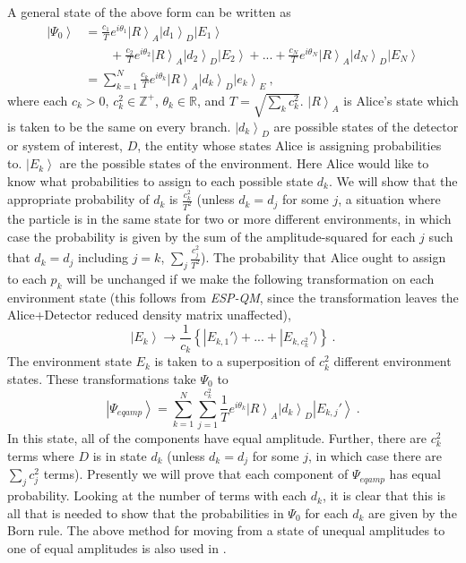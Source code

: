 \documentclass[12pt,onecolumn,secnumarabic,amsmath,amssymb,balancelastpage,nofootinbib]{article}
\newcommand{\ket}[1]{\ensuremath{\left|#1\right\rangle}}
\begin{document}
A general state of the above form can be written as
\begin{align}
\ket{\Psi_0}&= \frac{c_1}{T}e^{i\theta_1}\ket{R}_A\ket{d_1}_D\ket{E_1}\nonumber\\
&\qquad+\frac{c_2}{T}e^{i\theta_2}\ket{R}_A\ket{d_2}_D\ket{E_2}+...+\frac{c_N}{T}e^{i\theta_N}\ket{R}_A\ket{d_N}_D\ket{E_N}
\nonumber
\\
&= \sum_{k=1}^N{\frac{c_k}{T}e^{i\theta_k}\ket{R}_A\ket{d_k}_D\ket{e_k}_E}\ ,
\label{}
\end{align}
where each $c_k>0$, $c_k^2\in\mathbb{Z}^+$, $\theta_k\in\mathbb{R}$, and $T=\sqrt{\sum_k{c_k^2}}$.  $\ket{R}_A$ is Alice's state which is taken to be the same on every branch.  $\ket{d_k}_D$ are possible states of the detector or system of interest, $D$, the entity whose states Alice is assigning probabilities to.  $\ket{E_k}$ are the possible states of the environment.  Here Alice would like to know what probabilities to assign to each possible state $d_k$.  We will show that the appropriate probability of $d_k$ is $\frac{c_k^2}{T^2}$ (unless $d_k=d_j$ for some $j$, a situation where the particle is in the same state for two or more different environments, in which case the probability is given by the sum of the amplitude-squared for each $j$ such that $d_k=d_j$ including $j=k$, $\sum_j\frac{c_j^2}{T^2}$).  The probability that Alice ought to assign to each $p_k$ will be unchanged if we make the following transformation on each environment state (this follows from \emph{ESP-QM}, since the transformation leaves the Alice+Detector reduced density matrix unaffected),
\begin{equation}
\ket{E_k}\longrightarrow\frac{1}{c_k}\left\{|E_{k,1}'\rangle+...+|E_{k,c_k^2}'\rangle\right\}\ .
\label{}
\end{equation}
The environment state $E_k$ is taken to a superposition of $c_k^2$ different environment states.
These transformations take $\Psi_0$ to
\begin{equation}
\ket{\Psi_{eqamp}}=\sum_{k=1}^N{\sum_{j=1}^{c_k^2}\frac{1}{T}e^{i\theta_k}\ket{R}_A\ket{d_k}_D\ket{E_{k,j}'}}\ .
\label{eqamp}
\end{equation}
In this state, all of the components have equal amplitude.  Further, there are $c_k^2$ terms where $D$ is in state $d_k$ (unless $d_k=d_j$ for some $j$, in which case there are $\sum_j c_j^2$ terms).  Presently we will prove that each component of $\Psi_{eqamp}$ has equal probability.  Looking at the number of terms with each $d_k$, it is clear that this is all that is needed to show that the probabilities in $\Psi_0$ for each $d_k$ are given by the Born rule.  The above method for moving from a state of unequal amplitudes to one of equal amplitudes is also used in \citep[\textsection II.D]{zurek2005}.
\end{document}
